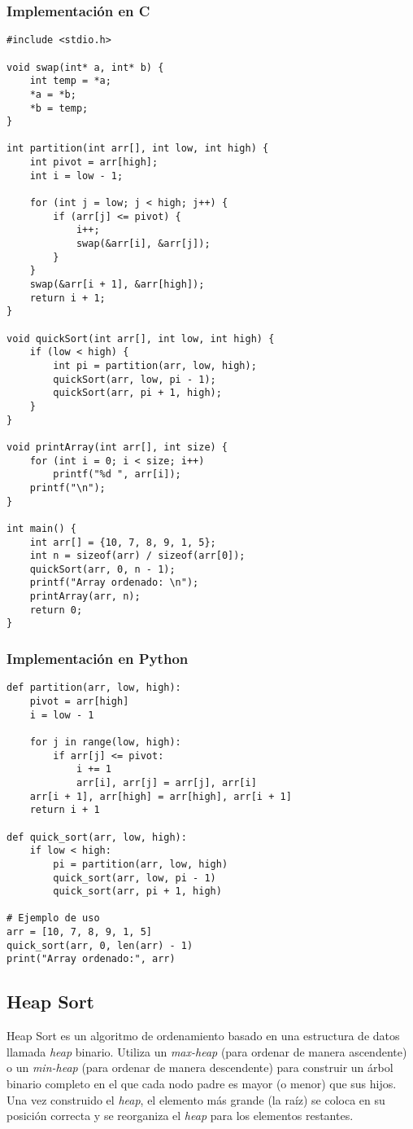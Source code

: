 \documentclass[11pt,openany]{book}
\begin{document}
\subsubsection{Implementación en C}
\lstset{language=C}
\begin{lstlisting}
#include <stdio.h>

void swap(int* a, int* b) {
    int temp = *a;
    *a = *b;
    *b = temp;
}

int partition(int arr[], int low, int high) {
    int pivot = arr[high];
    int i = low - 1;

    for (int j = low; j < high; j++) {
        if (arr[j] <= pivot) {
            i++;
            swap(&arr[i], &arr[j]);
        }
    }
    swap(&arr[i + 1], &arr[high]);
    return i + 1;
}

void quickSort(int arr[], int low, int high) {
    if (low < high) {
        int pi = partition(arr, low, high);
        quickSort(arr, low, pi - 1);
        quickSort(arr, pi + 1, high);
    }
}

void printArray(int arr[], int size) {
    for (int i = 0; i < size; i++)
        printf("%d ", arr[i]);
    printf("\n");
}

int main() {
    int arr[] = {10, 7, 8, 9, 1, 5};
    int n = sizeof(arr) / sizeof(arr[0]);
    quickSort(arr, 0, n - 1);
    printf("Array ordenado: \n");
    printArray(arr, n);
    return 0;
}
\end{lstlisting}

\subsubsection{Implementación en Python}
\lstset{language=Python}
\begin{lstlisting}
def partition(arr, low, high):
    pivot = arr[high]
    i = low - 1

    for j in range(low, high):
        if arr[j] <= pivot:
            i += 1
            arr[i], arr[j] = arr[j], arr[i]
    arr[i + 1], arr[high] = arr[high], arr[i + 1]
    return i + 1

def quick_sort(arr, low, high):
    if low < high:
        pi = partition(arr, low, high)
        quick_sort(arr, low, pi - 1)
        quick_sort(arr, pi + 1, high)

# Ejemplo de uso
arr = [10, 7, 8, 9, 1, 5]
quick_sort(arr, 0, len(arr) - 1)
print("Array ordenado:", arr)
\end{lstlisting}


\subsection{Heap Sort}
Heap Sort es un algoritmo de ordenamiento basado en una estructura de datos llamada \textit{heap} binario. Utiliza un \textit{max-heap} (para ordenar de manera ascendente) o un \textit{min-heap} (para ordenar de manera descendente) para construir un árbol binario completo en el que cada nodo padre es mayor (o menor) que sus hijos. Una vez construido el \textit{heap}, el elemento más grande (la raíz) se coloca en su posición correcta y se reorganiza el \textit{heap} para los elementos restantes.
\end{document}
